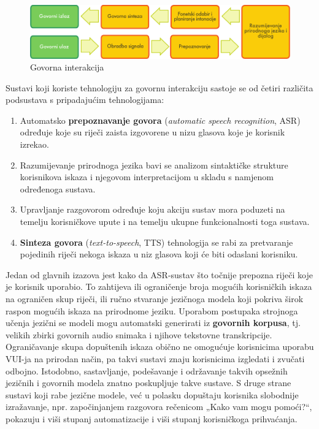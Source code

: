 \begin{multicols}{2}
\begin{figure}[htb]
  \center 
  \includegraphics[width=\textwidth]{../_media/croatian/simple_speech-based_dialogue_architecture}
  \caption{Govorna interakcija}
  \label{fig:dialoguearch_cro}
\end{figure}

Sustavi koji koriste tehnologiju za govornu interakciju sastoje se od četiri različita podsustava s pripadajućim tehnologijama:

\begin{enumerate}
\item Automatsko \textbf{prepoznavanje govora} (\emph{automatic speech recognition}, ASR) određuje koje su riječi zaista izgovorene u nizu glasova koje je korisnik izrekao.
\item Razumijevanje prirodnoga jezika bavi se analizom sintaktičke strukture korisnikova iskaza i njegovom interpretacijom u skladu s namjenom određenoga sustava.
\item Upravljanje razgovorom određuje koju akciju sustav mora poduzeti na temelju korisničkove upute i na temelju ukupne funkcionalnosti toga sustava.
\item \textbf{Sinteza govora} (\emph{text-to-speech}, TTS) tehnologija se rabi za pretvaranje pojedinih riječi nekoga iskaza u niz glasova koji će biti odaslani korisniku. 
\end{enumerate}


Jedan od glavnih izazova jest kako da ASR-sustav što točnije prepozna riječi koje je korisnik uporabio. To zahtijeva ili ograničenje broja mogućih korisničkih iskaza na ograničen skup riječi, ili ručno stvaranje jezičnoga modela koji pokriva širok raspon mogućih iskaza na prirodnome jeziku. Uporabom postupaka strojnoga učenja jezični se modeli mogu automatski generirati iz \textbf{govornih korpusa}, tj. velikih zbirki govornih audio snimaka i njihove tekstovne transkripcije. Ograničavanje skupa dopuštenih iskaza obično ne omogućuje korisnicima uporabu VUI-ja na prirodan način, pa takvi sustavi znaju korisnicima izgledati i zvučati odbojno. Istodobno, sastavljanje, podešavanje i održavanje takvih opsežnih jezičnih i govornih modela znatno poskupljuje takve sustave. S druge strane sustavi koji rabe jezične modele, već u polasku dopuštaju korisnika slobodnije izražavanje, npr. započinjanjem razgovora rečenicom „Kako vam mogu pomoći?“, pokazuju i viši stupanj automatizacije i viši stupanj korisničkoga prihvaćanja.


\end{multicols}
